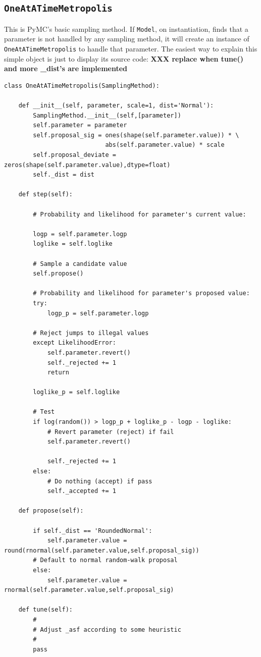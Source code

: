 \documentclass[]{book}
\begin{document}
\subsection{\texttt{OneAtATimeMetropolis}}\label{sub:OAATM}
This is PyMC's basic sampling method. If \texttt{Model}, on instantiation, finds that a parameter is not handled by any sampling method, it will create an instance of \texttt{OneAtATimeMetropolis} to handle that parameter. The easiest way to explain this simple object is just to display its source code: \textbf{XXX replace when tune() and more \_dist's are implemented}
\begin{verbatim}
class OneAtATimeMetropolis(SamplingMethod):

    def __init__(self, parameter, scale=1, dist='Normal'):
        SamplingMethod.__init__(self,[parameter])
        self.parameter = parameter
        self.proposal_sig = ones(shape(self.parameter.value)) * \
                            abs(self.parameter.value) * scale
        self.proposal_deviate = zeros(shape(self.parameter.value),dtype=float)
        self._dist = dist

    def step(self):

        # Probability and likelihood for parameter's current value:

        logp = self.parameter.logp
        loglike = self.loglike

        # Sample a candidate value
        self.propose()

        # Probability and likelihood for parameter's proposed value:
        try:
            logp_p = self.parameter.logp

        # Reject jumps to illegal values
        except LikelihoodError:
            self.parameter.revert()
            self._rejected += 1
            return

        loglike_p = self.loglike

        # Test
        if log(random()) > logp_p + loglike_p - logp - loglike:
            # Revert parameter (reject) if fail
            self.parameter.revert()

            self._rejected += 1
        else:
            # Do nothing (accept) if pass
            self._accepted += 1

    def propose(self):

        if self._dist == 'RoundedNormal':
            self.parameter.value = round(rnormal(self.parameter.value,self.proposal_sig))
        # Default to normal random-walk proposal
        else:
            self.parameter.value = rnormal(self.parameter.value,self.proposal_sig)

    def tune(self):
        #
        # Adjust _asf according to some heuristic
        #
        pass
\end{verbatim}
\end{document}
